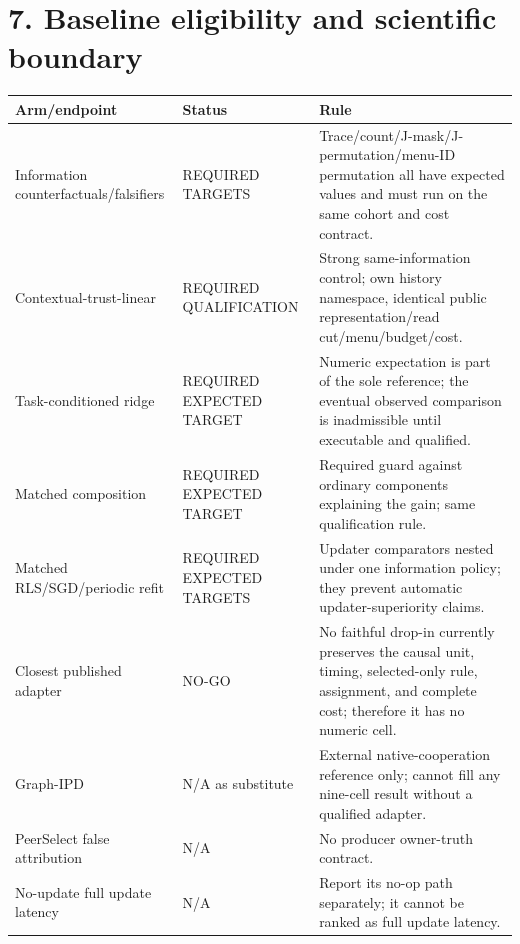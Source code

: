 \documentclass[10pt,a4paper,landscape]{article}
\begin{document}
\section*{7. Baseline eligibility and scientific boundary}
\begin{center}\small\begin{tabularx}{\linewidth}{@{}L{.25\linewidth}L{.16\linewidth}Y@{}}\toprule Arm/endpoint & Status & Rule \\\midrule
Information counterfactuals/falsifiers & REQUIRED TARGETS & Trace/count/J-mask/J-permutation/menu-ID permutation all have expected values and must run on the same cohort and cost contract. \\

Contextual-trust-linear & REQUIRED QUALIFICATION & Strong same-information control; own history namespace, identical public representation/read cut/menu/budget/cost. \\

Task-conditioned ridge & REQUIRED EXPECTED TARGET & Numeric expectation is part of the sole reference; the eventual observed comparison is inadmissible until executable and qualified. \\

Matched composition & REQUIRED EXPECTED TARGET & Required guard against ordinary components explaining the gain; same qualification rule. \\

Matched RLS/SGD/periodic refit & REQUIRED EXPECTED TARGETS & Updater comparators nested under one information policy; they prevent automatic updater-superiority claims. \\

Closest published adapter & NO-GO & No faithful drop-in currently preserves the causal unit, timing, selected-only rule, assignment, and complete cost; therefore it has no numeric cell. \\

Graph-IPD & N/A as substitute & External native-cooperation reference only; cannot fill any nine-cell result without a qualified adapter. \\

PeerSelect false attribution & N/A & No producer owner-truth contract. \\

No-update full update latency & N/A & Report its no-op path separately; it cannot be ranked as full update latency. \\

\bottomrule\end{tabularx}\end{center}
\end{document}
